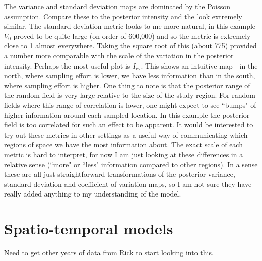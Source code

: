 \documentclass[12pt]{article}
\begin{document}
The variance and standard deviation maps are dominated by the Poisson assumption.  Compare these to the posterior intensity and the look extremely similar.  The standard deviation metric looks to me more natural, in this example $V_0$ proved to be quite large (on order of 600,000) and so the metric is extremely close to 1 almost everywhere.  Taking the square root of this (about 775) provided a number more comparable with the scale of the variation in the posterior intensity.  Perhaps the most useful plot is $I_{\text{cv}}$.  This shows an intuitive map - in the north, where sampling effort is lower, we have less information than in the south, where sampling effort is higher.  One thing to note is that the posterior range of the random field is very large relative to the size of the study region.  For random fields where this range of correlation is lower, one might expect to see ``bumps" of higher information around each sampled location.  In this example the posterior field is too correlated for such an effect to be apparent.  It would be interested to try out these metrics in other settings as a useful way of communicating which regions of space we have the most information about.  The exact scale of each metric is hard to interpret, for now I am just looking at these differences in a relative sense (``more" or ``less" information compared to other regions).  In a sense these are all just straightforward transformations of the posterior variance, standard deviation and coefficient of variation maps, so I am not sure they have really added anything to my understanding of the model.  

\section*{Spatio-temporal models}

Need to get other years of data from Rick to start looking into this.  
\end{document}
